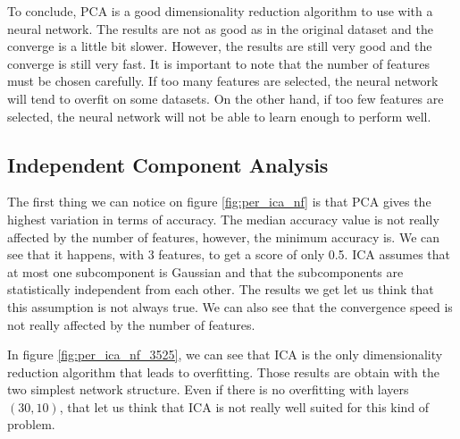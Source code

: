 \documentclass[twocolumn, 10pt]{article}
\begin{document}
			To conclude, PCA is a good dimensionality reduction algorithm to use with a neural network. The results are not as good as in the original dataset and the converge is a little bit slower. However, the results are still very good and the converge is still very fast. It is important to note that the number of features must be chosen carefully. If too many features are selected, the neural network will tend to overfit on some datasets. On the other hand, if too few features are selected, the neural network will not be able to learn enough to perform well.
		\subsection{Independent Component Analysis}
			The first thing we can notice on figure \ref{fig:per_ica_nf} is that PCA gives the highest variation in terms of accuracy. The median accuracy value is not really affected by the number of features, however, the minimum accuracy is. We can see that it happens, with 3 features, to get a score of only 0.5. ICA assumes that at most one subcomponent is Gaussian and that the subcomponents are statistically independent from each other. The results we get let us think that this assumption is not always true. We can also see that the convergence speed is not really affected by the number of features.

			In figure \ref{fig:per_ica_nf_3525}, we can see that ICA is the only dimensionality reduction algorithm that leads to overfitting. Those results are obtain with the two simplest network structure. Even if there is no overfitting with layers $(30, 10)$, that let us think that ICA is not really well suited for this kind of problem.
\end{document}
